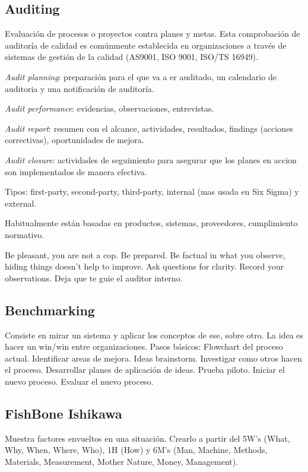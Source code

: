 \documentclass[]{article}
\begin{document}
\subsection{Auditing}

Evaluación de procesos o proyectos contra planes y metas. Esta comprobación de auditoría de calidad es comúnmente establecida en organizaciones a través de sistemas de gestión de la calidad (AS9001, ISO 9001, ISO/TS 16949).

\textit{Audit planning}: preparación para el que va a er auditado, un calendario de auditoria y una notificación de auditoría.

\textit{Audit performance}: evidencias, observaciones, entrevistas.

\textit{Audit report}: resumen con el alcance, actividades, resultados, findings (acciones correctivas), oportunidades de mejora.

\textit{Audit closure}: actividades de seguimiento para asegurar que los planes en accion son implementados de manera efectiva.

Tipos: first-party, second-party, third-party, internal (mas usada en Six Sigma) y external.

Habitualmente están basadas en productos, sistemas, proveedores, cumplimiento normativo.

Be pleasant, you are not a cop. Be prepared. Be factual in what you observe, hiding things doesn't help to improve. Ask questions for clarity. Record your observations. Deja que te guie el auditor interno.

\subsection{Benchmarking}

Consiste en mirar un sistema y aplicar los conceptos de ese, sobre otro. La idea es hacer un win/win entre organizaciones. Pasos básicos: Flowchart del proceso actual. Identificar areas de mejora. Ideas brainstorm. Investigar como otros hacen el proceso. Desarrollar planes de aplicación de ideas. Prueba piloto. Iniciar el nuevo proceso. Evaluar el nuevo proceso.

\subsection{FishBone Ishikawa}

Muestra factores envueltos en una situación. Crearlo a partir del 5W's (What, Why, When, Where, Who), 1H (How) y 6M's (Man, Machine, Methods, Materials, Measurement, Mother Nature, Money, Management).
\end{document}
